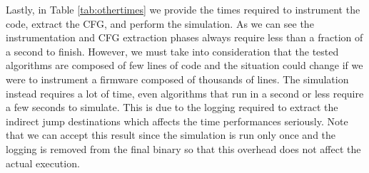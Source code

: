 Lastly, in Table \ref{tab:othertimes} we provide the times required to
instrument the code, extract the CFG, and perform the simulation. As we can see the
instrumentation and CFG extraction phases always require less than a fraction of
a second to finish. However, we must take into consideration that the tested algorithms
are composed of few lines of code and the situation could change if we were to instrument
a firmware composed of thousands of lines. The simulation instead requires a lot
of time, even algorithms that run in a second or less require a few seconds to simulate.
This is due to the logging required to extract the indirect jump destinations
which affects the time performances seriously. Note that we can accept this result
since the simulation is run only once and the logging is removed from the final binary
so that this overhead does not affect the actual execution.

